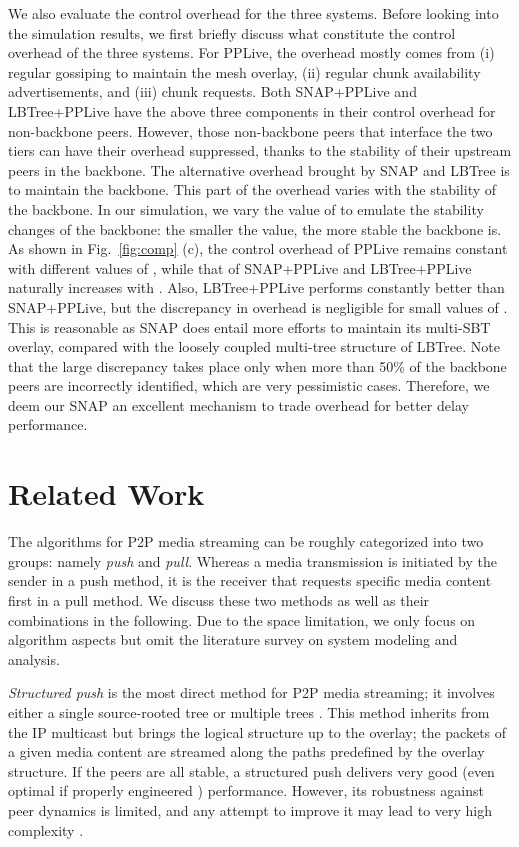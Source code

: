 \documentclass[conference]{IEEEtran}
\begin{document}
  We also evaluate the control overhead for the three systems. Before looking into the simulation results, we first briefly discuss what constitute the control overhead of the three systems. For PPLive, the overhead mostly comes from (i) regular gossiping to maintain the mesh overlay, (ii) regular chunk availability advertisements, and (iii) chunk requests. Both SNAP+PPLive and LBTree+PPLive have the above three components in their control overhead for non-backbone peers. However, those non-backbone peers that interface the two tiers can have their overhead suppressed, thanks to the stability of their upstream peers in the backbone. The alternative overhead brought by SNAP and LBTree is to maintain the backbone. This part of the overhead varies with the stability of the backbone. In our simulation, we vary the value of  to emulate the stability changes of the backbone: the smaller the value, the more stable the backbone is. As shown in Fig.~\ref{fig:comp} (c), the control overhead of PPLive remains constant with different values of , while that of SNAP+PPLive and LBTree+PPLive naturally increases with . Also, LBTree+PPLive performs constantly better than SNAP+PPLive, but the discrepancy in overhead is negligible for small values of . This is reasonable as SNAP does entail more efforts to maintain its multi-SBT overlay, compared with the loosely coupled multi-tree structure of LBTree. Note that the large discrepancy takes place only when more than 50\% of the backbone peers are incorrectly identified, which are very pessimistic cases. Therefore, we deem our SNAP an excellent mechanism to trade overhead for better delay performance.

\section{Related Work} \label{sec:rw}
The algorithms for P2P media streaming can be roughly categorized into two groups: namely \textit{push} and \textit{pull}. Whereas a media transmission is initiated by the sender in a push method, it is the receiver that requests specific media content first in a pull method. We discuss these two methods as well as their combinations in the following. Due to the space limitation, we only focus on algorithm aspects but omit the literature survey on system modeling and analysis.

  \textit{Structured push} is the most direct method for P2P media streaming; it involves either a single source-rooted tree \cite{ChuRZ-SIGMETRICS00,BanerjeeBK-SIGCOMM02} or multiple trees \cite{CastroDKNRS-SOSP03,VenkataramanYF-ICNP06,LiuSJRC-SIGMETRICS08}. This method inherits from the IP multicast \cite{DeeringC-TCS90} but brings the logical structure up to the overlay; the packets of a given media content are streamed along the paths predefined by the overlay structure. If the peers are all stable, a structured push delivers very good (even optimal if properly engineered \cite{LiuSJRC-SIGMETRICS08}) performance. However, its robustness against peer dynamics is limited, and any attempt to improve it may lead to very high complexity \cite{MaghareiRG-INFOCOM07}.
\end{document}
